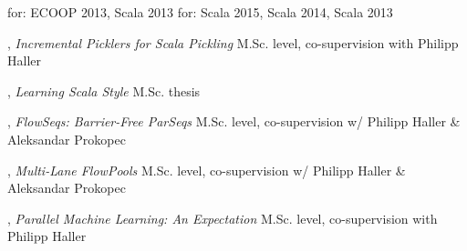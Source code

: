 \documentclass[9pt]{article}
\begin{document}
\medskip
{} for: ECOOP 2013, Scala 2013
\newline{} for: Scala 2015, Scala 2014, Scala 2013

\bigskip




\medskip
{}

, {\em Incremental Picklers for Scala Pickling} 
\newline\noindent M.Sc. level, co-supervision with Philipp Haller
\medskip

, {\em Learning Scala Style} 
\newline\noindent M.Sc. thesis
\medskip

, {\em FlowSeqs: Barrier-Free ParSeqs} 
\newline\noindent M.Sc. level, co-supervision w/ Philipp Haller \& Aleksandar Prokopec
\medskip

, {\em Multi-Lane FlowPools} 
\newline\noindent M.Sc. level, co-supervision w/ Philipp Haller \& Aleksandar Prokopec
\medskip

, {\em Parallel Machine Learning: An Expectation} 
\newline{}
\newline\noindent M.Sc. level, co-supervision with Philipp Haller
\medskip
\end{document}
